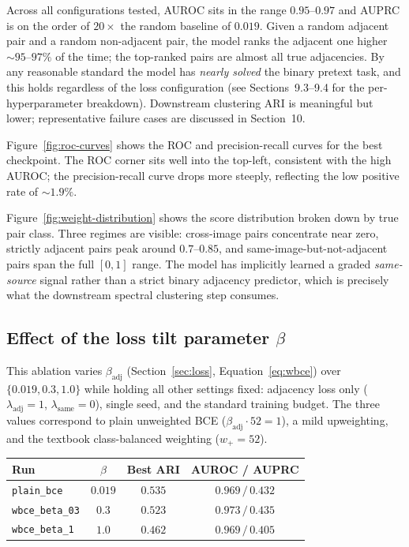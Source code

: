 \documentclass[12pt, a4paper]{article}
\begin{document}
Across all configurations tested, AUROC sits in the range $0.95$--$0.97$ and
AUPRC is on the order of $20\times$ the random baseline of $0.019$. Given a
random adjacent pair and a random non-adjacent pair, the model ranks the
adjacent one higher $\sim 95$--$97\%$ of the time; the top-ranked pairs are
almost all true adjacencies. By any reasonable standard the model has
\emph{nearly solved} the binary pretext task, and this holds regardless of
the loss configuration (see Sections~9.3--9.4 for the per-hyperparameter
breakdown). Downstream clustering ARI is meaningful but lower; representative
failure cases are discussed in Section~10.



Figure~\ref{fig:roc-curves} shows the ROC and precision-recall curves for the
best checkpoint. The ROC corner sits well into the top-left, consistent with
the high AUROC; the precision-recall curve drops more steeply, reflecting the
low positive rate of $\sim 1.9\%$.



Figure~\ref{fig:weight-distribution} shows the score distribution broken down
by true pair class. Three regimes are visible: cross-image pairs concentrate
near zero, strictly adjacent pairs peak around $0.7$--$0.85$, and
same-image-but-not-adjacent pairs span the full $[0, 1]$ range. The model has
implicitly learned a graded \emph{same-source} signal rather than a strict
binary adjacency predictor, which is precisely what the downstream spectral
clustering step consumes.

\subsection{Effect of the loss tilt parameter $\beta$}

This ablation varies $\beta_{\text{adj}}$ (Section~\ref{sec:loss},
Equation~\eqref{eq:wbce}) over $\{0.019, 0.3, 1.0\}$ while holding all
other settings fixed: adjacency loss only ($\lambda_{\text{adj}} = 1$,
$\lambda_{\text{same}} = 0$), single
seed, and the standard training budget. The three values correspond to plain
unweighted BCE ($\beta_{\text{adj}} \cdot 52 = 1$), a mild upweighting, and
the textbook class-balanced weighting ($w_{+} = 52$).

\begin{center}
\begin{tabular}{lccc}
\toprule
\textbf{Run} & \textbf{$\beta$} & \textbf{Best ARI} & \textbf{AUROC / AUPRC} \\
\midrule
\texttt{plain\_bce}     & $0.019$ & $0.535$ & $0.969 \,/\, 0.432$ \\
\texttt{wbce\_beta\_03} & $0.3$   & $0.523$ & $0.973 \,/\, 0.435$ \\
\texttt{wbce\_beta\_1}  & $1.0$   & $0.462$ & $0.969 \,/\, 0.405$ \\
\bottomrule
\end{tabular}
\end{center}
\end{document}
